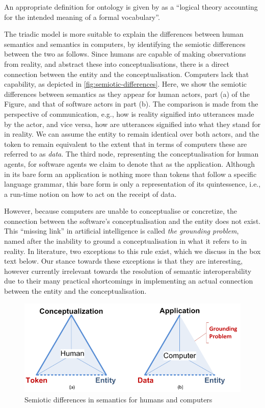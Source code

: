 \documentclass[a4paper,11pt,oneside,oldfontcommands]{memoir}
\theoremstyle{definition}
\theoremstyle{break}		%
\numberwithin{equation}{chapter}
\numberwithin{figure}{chapter}
\begin{document}
An appropriate definition for ontology is given by \cite{Guarino:1998wq}
as a ``logical theory accounting for the intended meaning of a formal
vocabulary''.

The triadic model is more suitable to explain the differences between
human semantics and semantics in computers, by identifying the semiotic
differences between the two as follows. Since humans are capable of
making observations from reality, and abstract these into
conceptualisations, there is a direct connection between the entity and
the conceptualisation. Computers lack that capability, as depicted in
\cref{fig:semiotic-differences}. Here, we show the semiotic differences
between semantics as they appear for human actors, part (a) of the
Figure, and that of software actors in part (b). The comparison is made
from the perspective of communication, e.g., how is reality signified
into utterances made by the actor, and vice versa, how are utterances
signified into what they stand for in reality. We can assume the entity
to remain identical over both actors, and the token to remain equivalent
to the extent that in terms of computers these are referred to as
\emph{data}. The third node, representing the conceptualisation for
human agents, for software agents we claim to denote that as the
application. Although in its bare form an application is nothing more
than tokens that follow a specific language grammar, this bare form is
only a representation of its quintessence, i.e., a run-time notion on
how to act on the receipt of data.

However, because computers are unable to conceptualise or concretize,
the connection between the software's conceptualisation and the entity
does not exist. This ``missing link'' in artificial intelligence is
called \emph{the grounding problem}, named after the inability to ground
a conceptualisation in what it refers to in reality. In literature, two
exceptions to this rule exist, which we discuss in the box text below.
Our stance towards these exceptions is that they are interesting,
however currently irrelevant towards the resolution of semantic
interoperability due to their many practical shortcomings in
implementing an actual connection between the entity and the
conceptualisation.

\begin{figure}
\hypertarget{fig:semiotic-diffs}{%
\centering
\includegraphics{src/images/SemioticDifferences.png}
\caption{Semiotic differences in semantics for humans and
computers}\label{fig:semiotic-diffs}
}
\end{figure}
\end{document}
